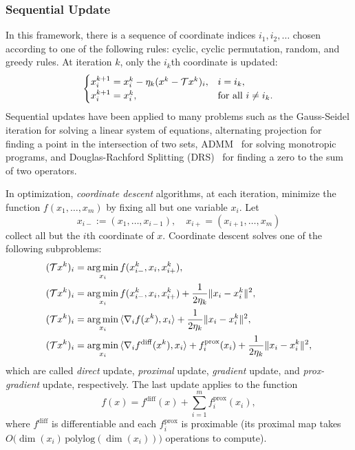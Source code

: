 \subsubsection{Sequential Update} In this framework, there is a sequence of coordinate indices $i_1,i_2,\ldots$ chosen according to one of the following rules: cyclic, cyclic permutation, random, and greedy rules. At  iteration $k$, only the $i_k$th coordinate is updated:
$$ \begin{cases}
x^{k+1}_{i} = x_{i}^k - \eta_k(x^k-\cT x^k)_{i},& i=i_k,\\
x^{k+1}_{i} = x_i^k,&\text{for all } i\not= i_k.
\end{cases}
$$
Sequential updates have been applied to many problems such as the Gauss-Seidel iteration for solving a linear system of equations, alternating projection \cite{von1949rings,bauschke1993convergence} for finding a point in the intersection of two sets,  ADMM~\cite{glowinski1975ADMM, gabay1976ADMM} for solving monotropic programs, and Douglas-Rachford Splitting (DRS)~\cite{douglas1956DRS}  for finding a zero to the sum of two operators. %

In optimization,  \emph{coordinate descent} algorithms, at each iteration, minimize the function $f(x_1,\ldots,x_m)$ by fixing all but one variable $x_i$. Let 
$$x_{i-}:=(x_1,\ldots,x_{i-1}),\quad x_{i+}=(x_{i+1},\ldots,x_m)$$
collect all but the $i$th coordinate of $x$. Coordinate descent solves one of the following subproblems:
\begin{subequations}\label{coordes}
\begin{align}
(\cT x^k)_i & = \argmin_{x_i}f(x_{i-}^k,x_i,x_{i+}^k),\\
(\cT x^k)_i & = \argmin_{x_i}f(x_{i-}^k,x_i,x_{i+}^k)+\frac{1}{2\eta_k}\|x_i-x_i^k\|^2,\\
(\cT x^k)_i & = \argmin_{x_i}\,\langle \nabla_i f(x^k),x_i \rangle+\frac{1}{2\eta_k}\|x_i-x_i^k\|^2,\\
(\cT x^k)_i & = \argmin_{x_i}\,\langle \nabla_i f^{\mathrm{diff}}(x^k),x_i \rangle+f_i^{\mathrm{prox}}(x_i)+\frac{1}{2\eta_k}\|x_i-x_i^k\|^2,
\end{align}
\end{subequations}
which are called \emph{direct} update, \emph{proximal} update,  \emph{gradient} update, and \emph{prox-gradient} update, respectively. The last update applies to the function $$f(x) = f^{\mathrm{diff}}(x)+\sum_{i=1}^mf^{\mathrm{prox}}_i(x_i),$$ where $f^{\mathrm{diff}}$ is differentiable and each $f^{\mathrm{prox}}_i$ is proximable (its proximal map takes $O\big(\dim(x_i)\,\mathrm{polylog}(\dim(x_i))\big)$ operations to compute).

